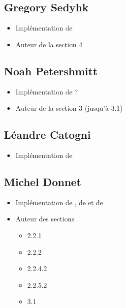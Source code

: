 \documentclass[
]{article}
\providecommand{\tightlist}{%
  \setlength{\itemsep}{0pt}\setlength{\parskip}{0pt}}
\begin{document}
\hypertarget{gregory-sedyhk}{%
\subsection{Gregory Sedyhk}\label{gregory-sedyhk}}

\begin{itemize}
\tightlist
\item
  Implémentation de 
\item
  Auteur de la section 4
\end{itemize}

\hypertarget{noah-petershmitt}{%
\subsection{Noah Petershmitt}\label{noah-petershmitt}}

\begin{itemize}
\tightlist
\item
  Implémentation de  ?
\item
  Auteur de la section 3 (jusqu'à 3.1)
\end{itemize}

\hypertarget{luxe9andre-catogni}{%
\subsection{Léandre Catogni}\label{luxe9andre-catogni}}

\begin{itemize}
\tightlist
\item
  Implémentation de 
\end{itemize}

\hypertarget{michel-donnet}{%
\subsection{Michel Donnet}\label{michel-donnet}}

\begin{itemize}
\tightlist
\item
  Implémentation de , de  et
  de 
\item
  Auteur des sections

  \begin{itemize}
  \tightlist
  \item
    2.2.1
  \item
    2.2.2
  \item
    2.2.4.2
  \item
    2.2.5.2
  \item
    3.1
  \end{itemize}
\end{itemize}

\newpage

\printbibliography[heading=bibintoc, title={Références}]
\end{document}
